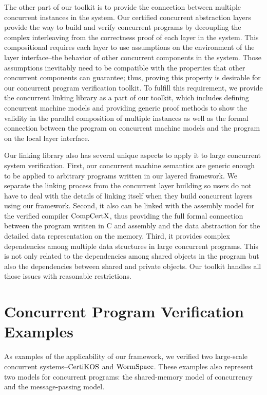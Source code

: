 The other part of our toolkit is to provide the connection between multiple concurrent instances in the system. 
Our certified concurrent abstraction layers provide the way to build and verify concurrent programs by decoupling 
the complex interleaving from the correctness proof of each layer in the system. 
This compositional requires each layer to use assumptions on the environment of the layer interface--the behavior of other concurrent components 
in the system. 
Those assumptions inevitably need to be compatible with the properties that other concurrent components can guarantee; 
thus, proving this property is desirable for our concurrent program verification toolkit. To fulfill this requirement, 
we provide the concurrent linking library as a part of our toolkit, which includes defining concurrent machine 
models and providing generic proof methods to show the validity in the parallel composition of multiple instances as well as 
the formal connection between the program on concurrent machine models and the program on the local layer interface.

Our linking library also has several unique aspects to apply it to large concurrent system verification. 
First, our concurrent machine semantics are generic enough to be applied to arbitrary programs written in our layered framework. 
We separate the linking process from the concurrent layer building so users do not have to deal with the details of linking itself when they 
build concurrent layers using our framework. Second, it also can be linked with the assembly model for the verified compiler $\mathrm{CompCertX}$, thus
 providing the full formal connection between the program written in C and assembly and the data abstraction for the detailed data 
 representation on the memory. Third, it provides complex dependencies among multiple data structures in large concurrent programs. 
 This is not only related to the dependencies among shared objects in the program but also the dependencies between 
 shared and private objects. Our toolkit handles all those issues with reasonable restrictions.

\section{Concurrent Program Verification Examples}
\label{chapter:introduction:sec:concurrent-program-verification-examples}


As examples of the applicability of our framework, we verified two large-scale concurrent systems--$\mathrm{CertiKOS}$ and $\mathrm{WormSpace}$.
These examples also represent two models for concurrent programs: 
the shared-memory model of concurrency and the message-passing model.

